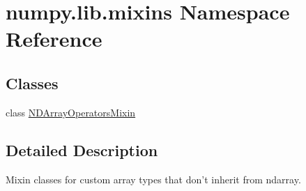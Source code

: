 \hypertarget{namespacenumpy_1_1lib_1_1mixins}{}\section{numpy.\+lib.\+mixins Namespace Reference}
\label{namespacenumpy_1_1lib_1_1mixins}
\subsection*{Classes}
\begin{DoxyCompactItemize}
\item 
class \hyperlink{classnumpy_1_1lib_1_1mixins_1_1NDArrayOperatorsMixin}{N\+D\+Array\+Operators\+Mixin}
\end{DoxyCompactItemize}


\subsection{Detailed Description}
\begin{DoxyVerb}Mixin classes for custom array types that don't inherit from ndarray.\end{DoxyVerb}
 